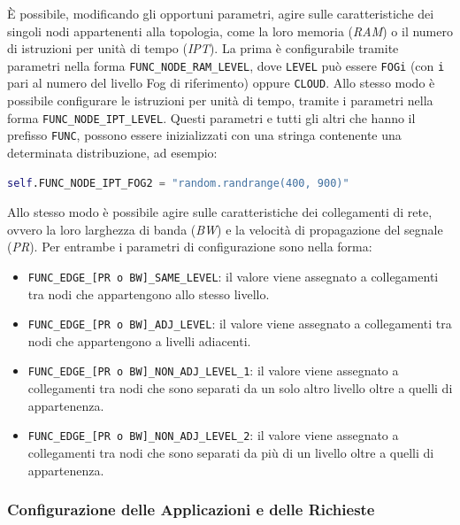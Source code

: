 È possibile, modificando gli opportuni parametri, agire sulle caratteristiche dei singoli nodi appartenenti alla topologia, come la loro memoria (\textit{RAM}) o il numero di istruzioni per unità di tempo (\textit{IPT}). La prima è configurabile tramite parametri nella forma \texttt{FUNC\_NODE\_RAM\_LEVEL}, dove \texttt{LEVEL} può essere \texttt{FOGi} (con \texttt{i} pari al numero del livello Fog di riferimento) oppure \texttt{CLOUD}. Allo stesso modo è possibile configurare le istruzioni per unità di tempo, tramite i parametri nella forma \texttt{FUNC\_NODE\_IPT\_LEVEL}. Questi parametri e tutti gli altri che hanno il prefisso \texttt{FUNC}, possono essere inizializzati con una stringa contenente una determinata distribuzione, ad esempio:
\begin{lstlisting}[language=python]
self.FUNC_NODE_IPT_FOG2 = "random.randrange(400, 900)"
\end{lstlisting}

Allo stesso modo è possibile agire sulle caratteristiche dei collegamenti di rete, ovvero la loro larghezza di banda (\textit{BW}) e la velocità di propagazione del segnale (\textit{PR}). Per entrambe i parametri di configurazione sono nella forma:
\begin{itemize}
	\item \texttt{FUNC\_EDGE\_[PR o BW]\_SAME\_LEVEL}: il valore viene assegnato a collegamenti tra nodi che appartengono allo stesso livello.
	\item \texttt{FUNC\_EDGE\_[PR o BW]\_ADJ\_LEVEL}: il valore viene assegnato a collegamenti tra nodi che appartengono a livelli adiacenti.
	\item \texttt{FUNC\_EDGE\_[PR o BW]\_NON\_ADJ\_LEVEL\_1}: il valore viene assegnato a collegamenti tra nodi che sono separati da un solo altro livello oltre a quelli di appartenenza.
	\item \texttt{FUNC\_EDGE\_[PR o BW]\_NON\_ADJ\_LEVEL\_2}: il valore viene assegnato a collegamenti tra nodi che sono separati da più di un livello oltre a quelli di appartenenza.
\end{itemize}

\subsubsection{Configurazione delle Applicazioni e delle Richieste}

